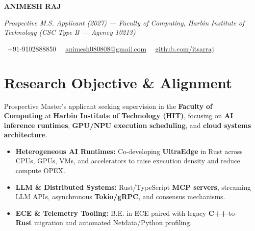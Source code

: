 \documentclass[a4paper,11pt]{article}
\newcommand{\socialicon}[1]{\raisebox{-0.05em}{\resizebox{!}{1em}{#1}}}
\newcommand{\headerfontiii}{\fontfamily{ppl}\selectfont} %
\begin{document}
\headerfontiii

\begin{center}
    {\Huge\textbf{ANIMESH RAJ}}
\end{center}
\vspace{-6mm}

\begin{center}
    {\small\textit{Prospective M.S. Applicant (2027) --- Faculty of Computing, Harbin Institute of Technology (CSC Type B — Agency 10213)}}
\end{center}
\vspace{-6mm}

\begin{center}
    {\small
    \socialicon{\faPhone}\ +91-9102888850 \textbar\ 
    \socialicon{\faEnvelope}\ \href{mailto:animesh080808@gmail.com}{animesh080808@gmail.com} \textbar\ 
    \socialicon{\faGithub}\ \href{https://github.com/itsarraj}{github.com/itsarraj}
    }
\end{center}
\vspace{-4mm}

\section{\textbf{Research Objective \& Alignment}}
\vspace{1mm}
{\small
Prospective Master's applicant seeking supervision in the \textbf{Faculty of Computing} at \textbf{Harbin Institute of Technology (HIT)}, focusing on \textbf{AI inference runtimes}, \textbf{GPU/NPU execution scheduling}, and \textbf{cloud systems architecture}.
\begin{itemize}[leftmargin=3ex, itemsep=0.4mm, topsep=1mm]
    \item \textbf{Heterogeneous AI Runtimes:} Co-developing \textbf{UltraEdge} in Rust across CPUs, GPUs, VMs, and accelerators to raise execution density and reduce compute OPEX.
    \item \textbf{LLM \& Distributed Systems:} Rust/TypeScript \textbf{MCP servers}, streaming LLM APIs, asynchronous \textbf{Tokio/gRPC}, and consensus mechanisms.
    \item \textbf{ECE \& Telemetry Tooling:} B.E. in ECE paired with legacy \textbf{C++}-to-\textbf{Rust} migration and automated Netdata/Python profiling.
\end{itemize}
}
\vspace{-3mm}
\end{document}
